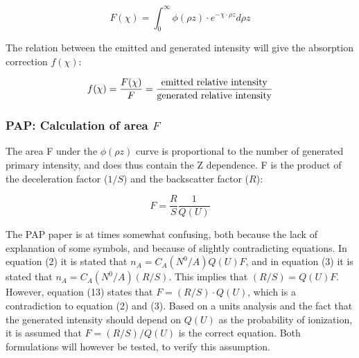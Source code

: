 \begin{equation}
    \label{eq:theory:quantitative:pap:general_principle:f_of_chi}
    F(\chi) = \int_0^\infty \phi(\rho z) \cdot e^{-\chi \cdot \rho z} d\rho z
\end{equation}


The relation between the emitted and generated intensity will give the absorption correction $f(\chi)$:

\begin{equation}
    \label{eq:theory:quantitative:pap:general_principle:f_absorption_correction}
    f(\chi) = \frac{F(\chi)}{F} = \frac{\textnormal{emitted relative intensity}}{\textnormal{generated relative intensity}}
\end{equation}















\subsubsection{PAP: Calculation of area $F$}
\label{theory:quantitative:pap:calculation_of_F}

The area F under the $\phi(\rho z)$ curve is proportional to the number of generated primary intensity, and does thus contain the Z dependence.
F is the product of the deceleration factor ($1/S$) and the backscatter factor ($R$):

\begin{equation}
    \label{eq:theory:quantitative:pap:calculation_of_F:F}
    F = \frac{R}{S}   \frac{1}{Q(U)}
\end{equation}

The PAP paper is at times somewhat confusing, both because the lack of explanation of some symbols, and because of slightly contradicting equations.
In equation (2) it is stated that $n_A = C_A (N^0/A) Q(U) F$, and in equation (3) it is stated that $n_A = C_A (N^0/A) (R/S)$.
This implies that $(R/S) = Q(U) F$.
However, equation (13) states that $F = (R/S) \cdot Q(U)$, which is a contradiction to equation (2) and (3).
Based on a units analysis and the fact that the generated intensity should depend on $Q(U)$ as the probability of ionization, it is assumed that $F = (R/S) / Q(U)$ is the correct equation.
Both formulations will however be tested, to verify this assumption.


